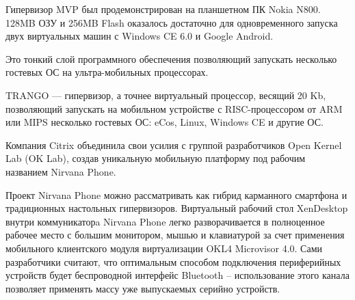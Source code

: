 \documentclass[10pt, a5paper]{article}
\begin{document}
Гипервизор MVP был продемонстрирован на планшетном ПК Nokia N800. 128MB ОЗУ и 256MB Flash оказалось достаточно для одновременного запуска двух виртуальных машин с Windows CE 6.0 и Google Android.

Это тонкий слой программного обеспечения позволяющий запускать несколько гостевых ОС на ультра-мобильных процессорах.

TRANGO --- гипервизор, а точнее виртуальный процессор, весящий 20 Kb, позволяющий запускать на мобильном устройстве с RISC-процессором от ARM или MIPS несколько гостевых ОС: eCos, Linux, Windows CE и другие ОС.

Компания Citrix объединила свои усилия с группой разработчиков Open Kernel Lab (OK Lab), создав уникальную мобильную платформу под рабочим названием Nirvana Phone.

Проект Nirvana Phone можно рассматривать как гибрид карманного смартфона и традиционных настольных гипервизоров. Виртуальный рабочий стол XenDesktop внутри коммуникаторa Nirvana Phone легко разворачивается в полноценное рабочее место с большим монитором, мышью и клавиатурой за счет применения мобильного клиентского модуля виртуализации OKL4 Microvisor 4.0. Сами разработчики считают, что оптимальным способом подключения периферийных устройств будет беспроводной интерфейс Bluetooth – использование этого канала позволяет применять массу уже выпускаемых серийно устройств.
\end{document}
